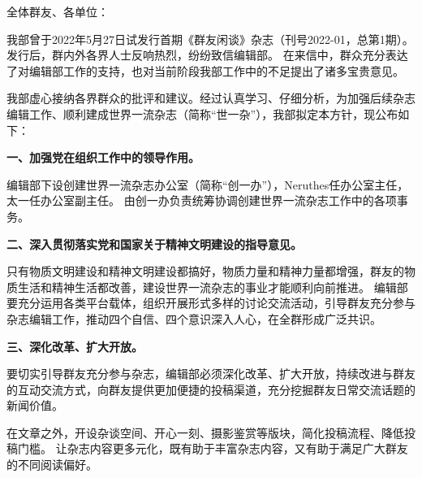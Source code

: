 



\rmfamily
\normalsize



\noindent
全体群友、各单位：

我部曾于2022年5月27日试发行首期《群友闲谈》杂志（刊号2022-01，总第1期）。发行后，群内外各界人士反响热烈，纷纷致信编辑部。
在来信中，群众充分表达了对编辑部工作的支持，也对当前阶段我部工作中的不足提出了诸多宝贵意见。

我部虚心接纳各界群众的批评和建议。经过认真学习、仔细分析，为加强后续杂志编辑工作、顺利建成世界一流杂志（简称“世一杂”），我部拟定本方针，现公布如下：

\textbf{一、加强党在组织工作中的领导作用。}

编辑部下设创建世界一流杂志办公室（简称“创一办”），Neruthes任办公室主任，太一任办公室副主任。
由创一办负责统筹协调创建世界一流杂志工作中的各项事务。

\textbf{二、深入贯彻落实党和国家关于精神文明建设的指导意见。}

只有物质文明建设和精神文明建设都搞好，物质力量和精神力量都增强，群友的物质生活和精神生活都改善，建设世界一流杂志的事业才能顺利向前推进。
编辑部要充分运用各类平台载体，组织开展形式多样的讨论交流活动，引导群友充分参与杂志编辑工作，推动四个自信、四个意识深入人心，在全群形成广泛共识。

\textbf{三、深化改革、扩大开放。}

要切实引导群友充分参与杂志，编辑部必须深化改革、扩大开放，持续改进与群友的互动交流方式，向群友提供更加便捷的投稿渠道，充分挖掘群友日常交流话题的新闻价值。

在文章之外，开设杂谈空间、开心一刻、摄影鉴赏等版块，简化投稿流程、降低投稿门槛。
让杂志内容更多元化，既有助于丰富杂志内容，又有助于满足广大群友的不同阅读偏好。

\clearpage











